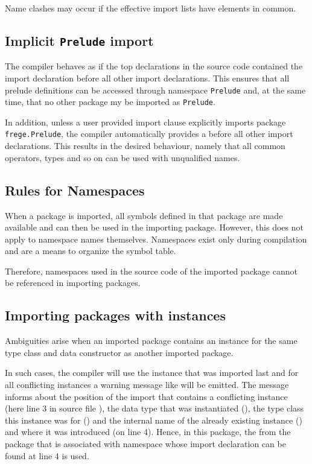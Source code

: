 Name clashes may occur if the effective import lists have elements in common. 

\subsection{Implicit \texttt{Prelude} import}
The compiler behaves as if the top declarations in
the source code contained the import declaration
before all other import declarations.
This ensures that all prelude definitions can be accessed through
namespace \texttt{Prelude} and, at the same time, that no other package my be imported as {\tt Prelude}.

In addition, unless a user provided import clause explicitly imports package \texttt{frege.Prelude}, the
compiler automatically provides a
before all other import declarations.
This results
in the desired behaviour, namely that all common operators, types and
so on can be used with unqualified names.


\subsection{Rules for Namespaces}

When a package is imported, all symbols defined in that package are made
available and can then be used in the importing package.
However, this does not apply to namespace names themselves. 
Namespaces exist only during compilation and are a means to organize the symbol table.

Therefore, namespaces used in the source code of the imported package
cannot be referenced in importing packages.

\subsection{Importing packages with instances}

Ambiguities arise when an imported package contains an instance for
the same type class and data constructor as another imported package.

In such cases, the compiler will use the instance that was imported last and for all conflicting instances a warning message like
will be emitted.
The message informs about the position of the import that contains a conflicting instance (here line 3 in source file ), the data type that was instantiated (), the type class this instance was for () and the internal name of the already existing instance () and where it was introduced (on line 4). Hence, in this package, the  from the package that is associated with namespace  whose import declaration can be found at line 4 is used.


